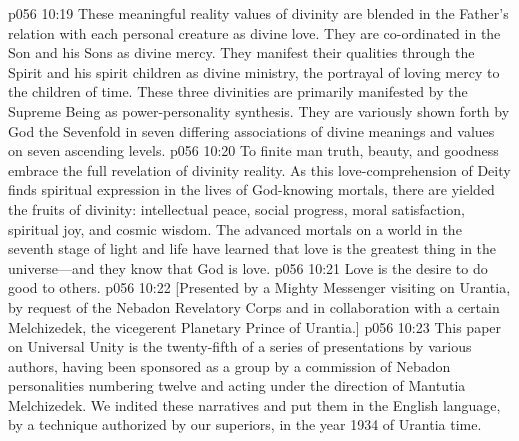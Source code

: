 \vs p056 10:19 These meaningful reality values of divinity are blended in the Father’s relation with each personal creature as divine love. They are co\hyp{}ordinated in the Son and his Sons as divine mercy. They manifest their qualities through the Spirit and his spirit children as divine ministry, the portrayal of loving mercy to the children of time. These three divinities are primarily manifested by the Supreme Being as power\hyp{}personality synthesis. They are variously shown forth by God the Sevenfold in seven differing associations of divine meanings and values on seven ascending levels.
\pc \vs p056 10:20 To finite man truth, beauty, and goodness embrace the full revelation of divinity reality. As this love\hyp{}comprehension of Deity finds spiritual expression in the lives of God\hyp{}knowing mortals, there are yielded the fruits of divinity: intellectual peace, social progress, moral satisfaction, spiritual joy, and cosmic wisdom. The advanced mortals on a world in the seventh stage of light and life have learned that love is the greatest thing in the universe---and they know that God is love.
\pc \vs p056 10:21 Love is the desire to do good to others.
\vsetoff
\pc \vs p056 10:22 [Presented by a Mighty Messenger visiting on Urantia, by request of the Nebadon Revelatory Corps and in collaboration with a certain Melchizedek, the vicegerent Planetary Prince of Urantia.]
\separatorline
\pc \vs p056 10:23 This paper on Universal Unity is the twenty\hyp{}fifth of a series of presentations by various authors, having been sponsored as a group by a commission of Nebadon personalities numbering twelve and acting under the direction of Mantutia Melchizedek. We indited these narratives and put them in the English language, by a technique authorized by our superiors, in the year 1934 of Urantia time.
